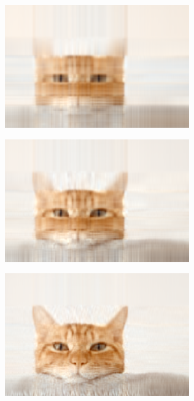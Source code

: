 \begin{solution}
    \begin{figure}[htb!]
        \centering
        \begin{subfigure}{.3\textwidth}
            \centering
            \includegraphics[width=.9\textwidth]{./img/matrix/cat_recon_10.png}
            \caption{}
            \label{fig_tensor_cp_result_1}
        \end{subfigure}
        \begin{subfigure}{.3\textwidth}
            \centering
            \includegraphics[width=.9\textwidth]{./img/matrix/cat_recon_20.png}
            \caption{}
            \label{fig_tensor_cp_result_2}
        \end{subfigure}
        \begin{subfigure}{.3\textwidth}
            \centering
            \includegraphics[width=.9\textwidth]{./img/matrix/cat_recon_50.png}

\end{subfigure}
\end{figure}
\end{solution}
